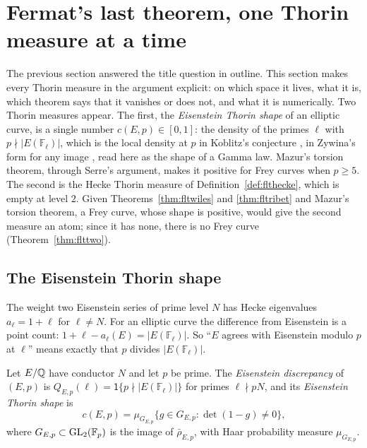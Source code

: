 \section{Fermat's last theorem, one Thorin measure at a time}\label{sec:fltexplicit}

The previous section answered the title question in outline. This section makes every Thorin measure in the argument explicit: on which space it lives, what it is, which theorem says that it vanishes or does not, and what it is numerically. Two Thorin measures appear. The first, the \emph{Eisenstein Thorin shape} of an elliptic curve, is a single number $c(E,p)\in[0,1]$: the density of the primes $\ell$ with $p\nmid|E(\mathbb F_\ell)|$, which is the local density at $p$ in Koblitz's conjecture \cite{koblitz1988}, in Zywina's form for any image \cite{zywina2011}, read here as the shape of a Gamma law. Mazur's torsion theorem, through Serre's argument, makes it positive for Frey curves when $p\ge5$. The second is the Hecke Thorin measure of Definition~\ref{def:flthecke}, which is empty at level $2$. Given Theorems~\ref{thm:fltwiles} and \ref{thm:fltribet} and Mazur's torsion theorem, a Frey curve, whose shape is positive, would give the second measure an atom; since it has none, there is no Frey curve (Theorem~\ref{thm:flttwo}).

\subsection{The Eisenstein Thorin shape}

The weight two Eisenstein series of prime level $N$ has Hecke eigenvalues $a_\ell=1+\ell$ for $\ell\ne N$. For an elliptic curve the difference from Eisenstein is a point count: $1+\ell-a_\ell(E)=|E(\mathbb F_\ell)|$. So ``$E$ agrees with Eisenstein modulo $p$ at $\ell$'' means exactly that $p$ divides $|E(\mathbb F_\ell)|$.

\begin{definition}\label{def:flteis}
Let $E/\mathbb{Q}$ have conductor $N$ and let $p$ be prime. The \emph{Eisenstein discrepancy} of $(E,p)$ is $Q_{E,p}(\ell)=\mathsf 1\{p\nmid|E(\mathbb F_\ell)|\}$ for primes $\ell\nmid pN$, and its \emph{Eisenstein Thorin shape} is
\[
c(E,p)=\mu_{G_{E,p}}\bigl\{g\in G_{E,p}:\det(1-g)\ne0\bigr\},
\]
where $G_{E,p}\subset\mathrm{GL}_2(\mathbb F_p)$ is the image of $\bar\rho_{E,p}$, with Haar probability measure $\mu_{G_{E,p}}$.
\end{definition}

